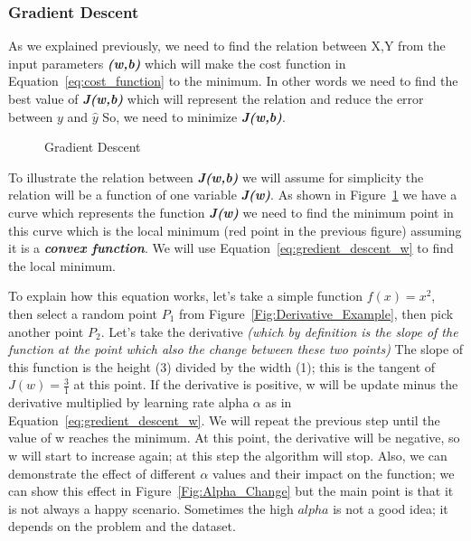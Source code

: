 \subsubsection{Gradient Descent}

As we explained previously, we need to find the relation between X,Y from the input parameters \textbf{\textit{(w,b)}} which will make the cost function in Equation~\eqref{eq:cost_function} to the minimum. In other words we need to find the best value of \textbf{\textit{J(w,b)}} which will represent the relation and reduce the error between $y$ and $\widehat{y}$ So, we need to minimize \textbf{\textit{J(w,b)}}.

\begin{figure}[t]
\begin{center}

\caption{Gradient Descent}\label{Fig:gradient_decent_surf}
\end{center}
\end{figure} 

To illustrate the relation between \textbf{\textit{J(w,b)}} we will assume for simplicity the relation will be a function of one variable \textbf{\textit{J(w)}}. As shown in Figure~\ref{Fig:gradient_decent_surf} we have a curve which represents the function \textbf{\textit{J(w)}} we need to find the minimum point in this curve which is the local minimum (red point in the previous figure) assuming it is a \textbf{\textit{convex function}}. We will use Equation~\eqref{eq:gredient_descent_w} to find the local minimum.

To explain how this equation works, let's take a simple function $f(x) = x^2$, then select a random point $P_1$ from Figure~\ref{Fig:Derivative_Example}, then pick another point $P_2$. Let's take the derivative \textit{(which by definition is the slope of the function at the point which also the change between these two points)} The slope of this function is the height (3) divided by the width (1); this is the tangent of $J(w)=\frac{3}{1}$ at this point. If the derivative is positive, w will be update minus the derivative multiplied by learning rate alpha $\alpha$ as in Equation~\eqref{eq:gredient_descent_w}. We will repeat the previous step until the value of w reaches the minimum. At this point, the derivative will be negative, so w will start to increase again; at this step the algorithm will stop. Also, we can demonstrate the effect of different $\alpha$ values and their impact on the function; we can show this effect in Figure~\ref{Fig:Alpha_Change} but the main point is that it is not always a happy scenario. Sometimes the high $alpha$ is not a good idea; it depends on the problem and the dataset.

